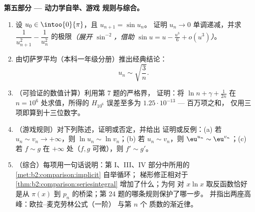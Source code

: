 \begin{problem}
\medskip
\noindent\textbf{第五部分 --- 动力学自举、游戏
规则与综合。}
\begin{enumerate}[resume]
  \item 设 $u_0 \in \intoo{0}{\pi}$，且 $u_{n+1} = \sin u_n$。
        证明 $u_n \to 0$ 单调递减，并求
        $\dfrac{1}{u_{n+1}^2} - \dfrac{1}{u_n^2}$ 的极限\emph{（展开
        $\sin^{-2}$，借助 $\sin u = u - \frac{u^3}6 + o(u^3)$）}。
  \item 由切萨罗平均（本科一年级分册）推出经典结论：
        \[
        u_n \sim \sqrt{\frac{3}{n}} .
        \]
  \item （可验证的数值计算）利用第 7 题的严格界，
        证明：将 $\ln n + \gamma + \frac1{2n}$ 在 $n
        = 10^6$ 处求值，所得的 $H_{10^6}$ 误差至多为
        $1.25\cdot10^{-13}$ --- 百万项之和，
        仅用三项即算到十三位数字。
  \item （游戏规则）对下列陈述，证明或否定，并给出
        证明或反例：(a) 若 $u_n \sim v_n \to +\infty$，则
        $\ln u_n \sim \ln v_n$；(b) 若 $u_n \sim v_n$，则
        $\eu^{u_n} \sim \eu^{v_n}$；(c) 若 $f \sim g$ 在
        $+\infty$ 处（$f, g$ 可微），则 $f' \sim g'$。
  \item （综合）每项用一句话说明：第 I、III、IV 部分中所用的
        \cref{met:b2:comparison:implicit} 自举循环；
        梯形修正相对于
        \cref{thm:b2:comparison:seriesintegral} 增加了什么；为何
        对 $x\ln x$ 取反函数恰好是从 $\pi(x)$ 到
        $p_n$ 的桥梁；第 24 题的哪条规则保护了哪一步。
        并指出两座高峰：欧拉–麦克劳林公式（一阶）
        与第 $n$ 个
        质数的渐近律。
\end{enumerate}
\end{problem}
